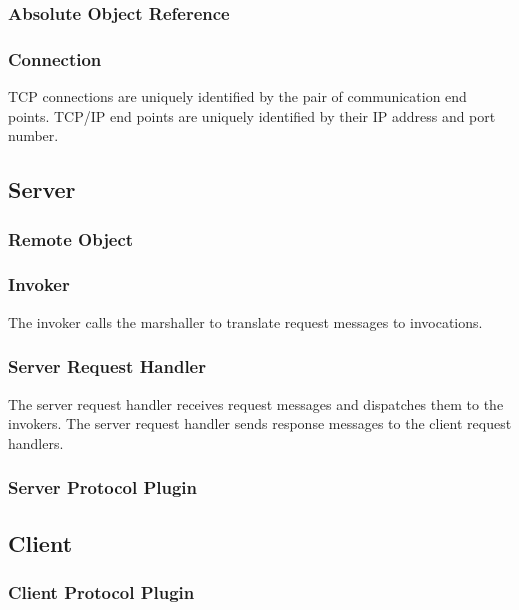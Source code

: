 \subsubsection{Absolute Object Reference}

\subsubsection{Connection}

TCP connections are uniquely identified by the pair of communication end points.
TCP/IP end points are uniquely identified by their IP address and port number.

\subsection{Server}

\subsubsection{Remote Object}

\subsubsection{Invoker}

The invoker calls the marshaller to translate request messages to invocations.

\subsubsection{Server Request Handler}

The server request handler receives request messages and dispatches them to the invokers.
The server request handler sends response messages to the client request handlers.

\subsubsection{Server Protocol Plugin}

\subsection{Client}

\subsubsection{Client Protocol Plugin}

